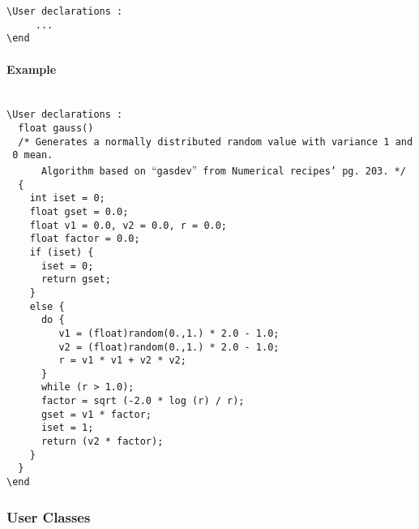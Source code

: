 \documentclass{book}
\begin{document}
\texttt{\textbackslash{}User~declarations~:}\\\texttt{~~~~~...}\\\texttt{\textbackslash{}end}

\paragraph{Example}\label{example-1}
~\\

\texttt{\textbackslash{}User~declarations~:}\\\texttt{~~float~gauss()}\\\texttt{~~/*~Generates~a~normally~distributed~random~value~with~variance~1~and~0~mean.}\\\texttt{~~~~~~Algorithm~based~on~}``\texttt{gasdev}''\texttt{~from~Numerical~recipes'~pg.~203.~*/}\\\texttt{~~\{}\\\texttt{~~~~int~iset~=~0;}\\\texttt{~~~~float~gset~=~0.0;}\\\texttt{~~~~float~v1~=~0.0,~v2~=~0.0,~r~=~0.0;}\\\texttt{~~~~float~factor~=~0.0;}\\\texttt{~~~~if~(iset)~\{}\\\texttt{~~~~~~iset~=~0;}\\\texttt{~~~~~~return~gset;}\\\texttt{~~~~\}}\\\texttt{~~~~else~\{~~~~}\\\texttt{~~~~~~do~\{}\\\texttt{~~~~~~~~~v1~=~(float)random(0.,1.)~*~2.0~-~1.0;}\\\texttt{~~~~~~~~~v2~=~(float)random(0.,1.)~*~2.0~-~1.0;}\\\texttt{~~~~~~~~~r~=~v1~*~v1~+~v2~*~v2;}\\\texttt{~~~~~~\}~}\\\texttt{~~~~~~while~(r~\textgreater{}~1.0);}\\\texttt{~~~~~~factor~=~sqrt~(-2.0~*~log~(r)~/~r);}\\\texttt{~~~~~~gset~=~v1~*~factor;}\\\texttt{~~~~~~iset~=~1;}\\\texttt{~~~~~~return~(v2~*~factor);}\\\texttt{~~~~\}}\\\texttt{~~\}}\\\texttt{\textbackslash{}end}

\subsubsection{User Classes}\label{user-classes}
\end{document}
